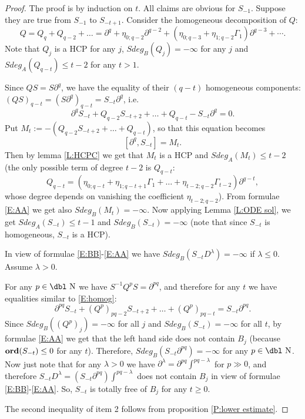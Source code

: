 \documentclass[11pt]{article}
\theoremstyle{definition}
\newcommand{\dn}{{\mbox{\dbl N}}}
\newcommand{\Ord}{\mathop {\rm \bf ord}}
\theoremstyle{plain}
\numberwithin{equation}{section}
\begin{document}
\begin{proof}
	The proof is by induction on $t$. All claims are obvious for $S_{-1}$. Suppose they are true from $S_{-1}$ to $S_{-t+1}$. Consider the homogeneous decomposition of $Q$: 
	$$
	Q=Q_q+Q_{q-2}+\ldots =\partial^q+\eta_{0;q-2}\partial^{q-2}+(\eta_{0;q-3}+\eta_{1;q-2}\Gamma_1)\partial^{q-3}+\cdots .
	$$
	Note that $Q_j$ is a HCP for any $j$, $Sdeg_B(Q_j)=-\infty$ for any $j$ and $Sdeg_A(Q_{q-t})\le t-2$ for any $t> 1$. 
	
Since $QS=S\partial^q$, we have the equality of their $(q-t)$ homogeneous components: $(QS)_{q-t}= (S\partial^q)_{q-t}=S_{-t}\partial^q$, i.e. 
\begin{equation}
\label{E:homog}
\partial^q S_{-t}+Q_{q-2} S_{-t+2}+\dots+Q_{q-t}-S_{-t}\partial^q=0.
\end{equation}	
Put $M_t:=-(Q_{q-2} S_{-t+2}+\dots+Q_{q-t})$, so that this equation becomes 
$$[\partial^q,S_{-t}]=M_t.$$ 
Then by lemma \ref{L:HCPC} we get that $M_t$ is a HCP and $Sdeg_A(M_t)\le t-2$ (the only possible term  of degree $t-2$ is $Q_{q-t}$:
 $$
 Q_{q-t}=(\eta_{0;q-t}+\eta_{1;q-t+1}\Gamma_1+\dots+\eta_{t-2;q-2}\Gamma_{t-2})\partial^{q-t},
 $$
whose degree depends on vanishing the coefficient $\eta_{t-2;q-2}$). From formulae \eqref{E:AA}  we get also $Sdeg_B(M_t)=-\infty$. Now applying Lemma \ref{L:ODE sol}, we get $Sdeg_A(S_{-t})\le t-1$ and $Sdeg_B(S_{-t})=-\infty$ (note that since $S_{-t}$ is homogeneous, $S_{-t}$ is a HCP).

In view of formulae \eqref{E:BB}-\eqref{E:AA} we have $Sdeg_B(S_{-t} D^\lambda)=-\infty $  if $\lambda \le 0$. Assume $\lambda >0$. 

For any $p\in\dn$ we have $S^{-1}Q^pS=\partial^{pq}$, and therefore for any $t$ we have equalities similar to \eqref{E:homog}: 	
	$$
	\partial^{pq} S_{-t}+(Q^p)_{pq-2} S_{-t+2}+\dots+ (Q^p)_{pq-t}=S_{-t}\partial^{pq}.
	$$
	Since $Sdeg_B((Q^p)_j)=-\infty$ for all $j$ and $Sdeg_B(S_{-t})=-\infty$ for all $t$, by formulae \eqref{E:AA} we get that the left hand side does not contain $B_j$ (because $\Ord (S_{-t})\le 0$ for any $t$). Therefore, $Sdeg_B(S_{-t}\partial^{pq})=-\infty$ for any $p\in \dn$. Now just note that for any $\lambda >0$ we have $\partial^{\lambda}= \partial^{pq}\int^{pq-\lambda}$ for $p\gg 0$, and therefore $S_{-t}D^{\lambda}=(S_{-t}\partial^{pq})\int^{pq-\lambda }$  does not contain $B_j$ in view of formulae \eqref{E:BB}-\eqref{E:AA}. So, $S_{-t}$ is totally free of $B_j$ for any $t\ge 0$.
	
	The second inequality of item 2 follows from proposition \ref{P:lower estimate}.	    	
\end{proof}
\end{document}
